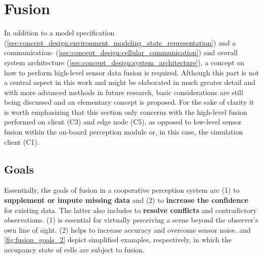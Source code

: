 \section{Fusion}
\label{sec:concept_design:fusion}
In addition to a model specification (\cref{sec:concept_design:environment_modeling_state_representation}) and a communication- (\cref{sec:concept_design:cellular_communication}) and overall system architecture (\cref{sec:concept_design:system_architecture}), a concept on how to perform high-level sensor data fusion is required. Although this part is not a central aspect in this work and might be elaborated in much greater detail and with more advanced methods in future research, basic considerations are still being discussed and an elementary concept is proposed. For the sake of clarity it is worth emphasizing that this section only concerns with the high-level fusion performed on client (C3) and edge node (C5), as opposed to low-level sensor fusion within the on-board perception module or, in this case, the simulation client (C1).

\subsection{Goals}
\label{subsec:concept_design:fusion_goals}
Essentially, the goals of fusion in a cooperative perception system are (1) to \textbf{supplement or impute missing data} and (2) to \textbf{increase the confidence} for existing data. The latter also includes to \textbf{resolve conflicts} and contradictory observations. (1) is essential for virtually perceiving a scene beyond the observer's own line of sight. (2) helps to increase accuracy and overcome sensor noise.  and \cref{fig:fusion_goals_2} depict simplified examples, respectively, in which the occupancy state of cells are subject to fusion.
\par
\bigskip

